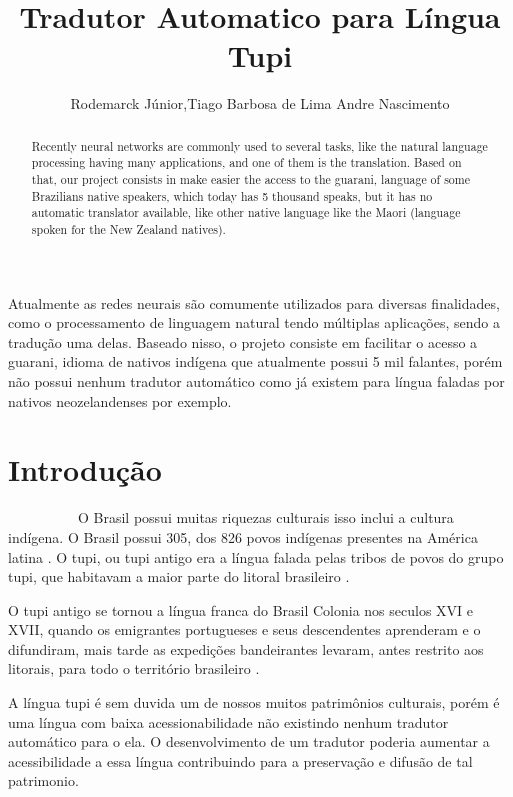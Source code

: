 \documentclass[12pt]{article}
\title{Tradutor Automatico para Língua Tupi}
\author{Rodemarck Júnior\inst{1},Tiago Barbosa de Lima\inst{1} Andre Nascimento\inst{1} }
\begin{document}
 

\maketitle
\begin{abstract}

    Recently neural networks are commonly used to several tasks, like the natural language processing having many applications, and one of them is the translation. Based on that, our project consists in make easier the access to the guarani, language of some Brazilians native speakers, which today has 5 thousand speaks, but it has no automatic translator available, like other native language like the Maori (language spoken for the New Zealand natives).
\end{abstract}

\begin{resumo}
Atualmente as redes neurais são comumente utilizados para diversas finalidades, como o processamento de linguagem natural tendo múltiplas aplicações, sendo a tradução uma delas. Baseado nisso, o projeto consiste em facilitar o acesso a guarani, idioma de nativos indígena que atualmente possui 5 mil falantes, porém não possui nenhum tradutor automático como já existem para língua faladas por nativos neozelandenses por exemplo.
\end{resumo}


\section{Introdução} 

~~~~~~~~~~O Brasil possui muitas riquezas culturais isso inclui a cultura indígena. O Brasil possui 305, dos 826 povos indígenas presentes na América latina \cite{povos_indigenas}. O tupi, ou tupi antigo era a língua falada pelas tribos de povos do grupo tupi, que habitavam a maior parte do litoral brasileiro \cite{Dicionario_Tupi_Antigo}.

O tupi antigo se tornou a língua franca do Brasil Colonia nos seculos XVI e XVII, quando os emigrantes portugueses e seus descendentes aprenderam e o difundiram, mais tarde as expedições bandeirantes levaram, antes restrito aos litorais, para todo o território brasileiro \cite{Tupi_Antigo}.

A língua tupi é sem duvida um de nossos muitos patrimônios culturais,  porém é uma língua com baixa acessionabilidade não existindo nenhum tradutor automático para o ela. O desenvolvimento de um tradutor poderia aumentar a acessibilidade a essa língua contribuindo para a preservação e difusão de tal patrimonio. 
\end{document}
